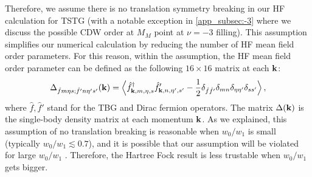 \documentclass[prb,aps,nofootinbib,amssymb,twocolumn,superscriptaddress,10pt]{revtex4-2}
\begin{document}
Therefore, we assume there is no translation symmetry breaking in our HF calculation for TSTG (with a notable exception in \ref{app_subsec:-3} where we discuss the possible CDW order at $M_M$ point at $\nu=-3$ filling). This assumption simplifies our numerical calculation by reducing the number of HF mean field order parameters. For this reason, within the assumption, the HF mean field order parameter can be defined as the following $16\times 16$ matrix at each $\mathbf{k}$:
\begin{equation}\label{eqn:def_order_parameter}
	\Delta_{\hat{f}m\eta s;\hat{f}'n\eta' s'}(\mathbf{k}) = \Big{\langle} \hat{f}^\dagger_{\mathbf{k},m,\eta, s}\hat{f}'_{\mathbf{k},n,\eta', s'} - \frac12 \delta_{\hat{f}\hat{f}'}\delta_{mn}\delta_{\eta\eta'}\delta_{ss'} \Big{\rangle}\,,
\end{equation}
where $\hat{f}, \hat{f}'$ stand for the TBG and Dirac fermion operators. The matrix $\Delta(\mathbf{k})$ is the single-body density matrix at each momentum $\mathbf{k}$.
As we explained, this assumption of no translation breaking is reasonable when $w_0/w_1$ is small (typically $w_0/w_1 \lesssim 0.7$), and it is possible that our assumption will be violated for large $w_0/w_1$ \cite{KAN18,XIE20a}. Therefore, the Hartree Fock result is less trustable when $w_0/w_1$ gets bigger.
\end{document}
